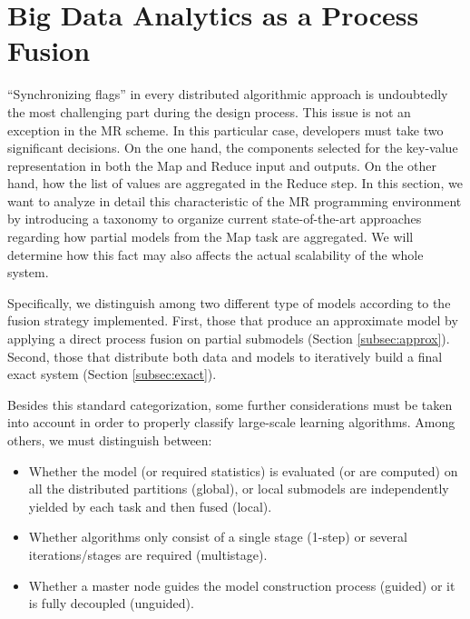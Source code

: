 \documentclass[3p,review]{elsarticle}
\begin{document}
	\section{Big Data Analytics as a Process Fusion}\label{sec:fusion}
	
	``Synchronizing flags'' in every distributed algorithmic approach is undoubtedly the most challenging part during the design process. This issue is not an exception in the MR scheme. In this particular case, developers must take two significant decisions. On the one hand, the components selected for the key-value representation in both the Map and Reduce input and outputs. On the other hand, how the list of values are aggregated in the Reduce step. In this section, we want to analyze in detail this characteristic of the MR programming environment by introducing a taxonomy to organize current state-of-the-art approaches regarding how partial models from the Map task are aggregated. We will determine how this fact may also affects the actual scalability of the whole system. 
	
	Specifically, we distinguish among two different type of models according to the fusion strategy implemented. First, those that produce an approximate model by applying a direct process fusion  on partial submodels (Section \ref{subsec:approx}). Second, those that distribute both data and models to iteratively build a final exact system (Section \ref{subsec:exact}).
	
	Besides this standard categorization, some further considerations must be taken into account in order to properly classify large-scale learning algorithms. Among others, we must distinguish between: 
	
	\begin{itemize}
		\item Whether the model (or required statistics) is evaluated (or are computed) on all the distributed partitions (global), or local submodels are independently yielded by each task and then fused (local).
		\item Whether algorithms only consist of a single stage (1-step) or several iterations/stages are required (multistage).
		\item Whether a master node guides the model construction process (guided) or it is fully decoupled (unguided). 
	\end{itemize}
	
\end{document}

